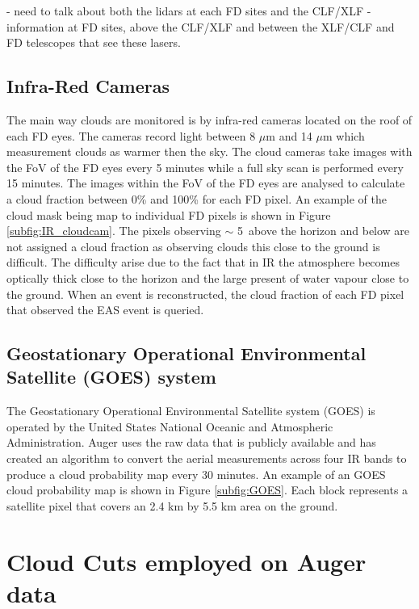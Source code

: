 - need to talk about both the lidars at each FD sites and the CLF/XLF
- information at FD sites, above the CLF/XLF and between the XLF/CLF and FD telescopes that see these lasers.



\subsection{Infra-Red Cameras}

The main way clouds are monitored is by infra-red cameras located on the roof of each FD eyes. The cameras record light between 8 $\mu$m and 14 $\mu$m which measurement clouds as warmer then the sky. The cloud cameras take images with the FoV of the FD eyes every 5 minutes while a full sky scan is performed every 15 minutes. The images within the FoV of the FD eyes are analysed to calculate a cloud fraction between 0\% and 100\% for each FD pixel. An example of the cloud mask being map to individual FD pixels is shown in Figure \ref{subfig:IR_cloudcam}. The pixels observing $\sim$ 5\textdegree \ above the horizon and below are not assigned a cloud fraction as observing clouds this close to the ground is difficult. The difficulty arise due to the fact that in IR the atmosphere becomes optically thick close to the horizon and the large present of water vapour close to the ground. When an event is reconstructed, the cloud fraction of each FD pixel that observed the EAS event is queried.

\subsection{Geostationary Operational Environmental Satellite (GOES) system}

The Geostationary Operational Environmental Satellite system (GOES) is operated by the United States National Oceanic and Atmospheric Administration. Auger uses the raw data that is publicly available and has created an algorithm to convert the aerial measurements across four IR bands to produce a cloud probability map every 30 minutes. An example of an GOES cloud probability map is shown in Figure \ref{subfig:GOES}. Each block represents a satellite pixel that covers an 2.4 km by 5.5 km area on the ground.

\section{Cloud Cuts employed on Auger data}

